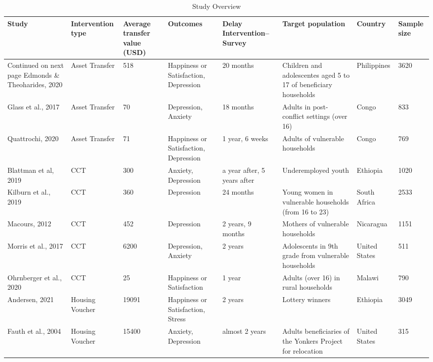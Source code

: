 \begingroup\scriptsize
\begin{longtable}{p{1.8cm}p{1.7cm}p{1.3 cm}p{1.8cm}p{1.7cm}p{2cm}p{1.2cm}p{1cm}}
\caption{Study Overview} \\ 
  \hline
{\textbf{Study}} & {\textbf{Intervention type}} & {\textbf{Average transfer value (USD)}} & {\textbf{Outcomes}} & {\textbf{Delay Intervention--Survey}} & {\textbf{Target 
 population}} & {\textbf{Country}} & {\textbf{Sample 
 size}} \\ 
  \hline 
\endhead 
\hline 
{\footnotesize Continued on next page} 
\endfoot 
\endlastfoot 
 \hline
Edmonds \& Theoharides, 2020 & Asset Transfer & 518 & Happiness or Satisfaction, Depression & 20 months & Children and adolescentes aged 5 to 17 of beneficiary households & Philippines & 3620 \\ 
   \hline
Glass et al., 2017 & Asset Transfer & 70 & Depression, Anxiety & 18 months & Adults in post-conflict settings (over 16) & Congo & 833 \\ 
   \hline
Quattrochi, 2020 & Asset Transfer & 71 & Happiness or Satisfaction, Depression & 1 year, 6 weeks & Adults of vulnerable households & Congo & 769 \\ 
   \hline
Blattman et al, 2019 & CCT & 300 & Anxiety, Depression & a year after, 5 years after & Underemployed youth & Ethiopia & 1020 \\ 
   \hline
Kilburn et al., 2019 & CCT & 360 & Depression & 24 months & Young women in vulnerable households (from 16 to 23) & South Africa & 2533 \\ 
   \hline
Macours, 2012 & CCT & 452 & Depression & 2 years, 9 months & Mothers of vulnerable households & Nicaragua & 1151 \\ 
   \hline
Morris et al., 2017 & CCT & 6200 & Depression, Anxiety & 2 years & Adolescents in 9th grade from vulnerable households & United States & 511 \\ 
   \hline
Ohrnberger et al., 2020 & CCT & 25 & Happiness or Satisfaction & 1 year & Adults (over 16) in rural households & Malawi & 790 \\ 
   \hline
Andersen, 2021 & Housing Voucher & 19091 & Happiness or Satisfaction, Stress & 2 years & Lottery winners & Ethiopia & 3049 \\ 
   \hline
Fauth et al., 2004 & Housing Voucher & 15400 & Anxiety, Depression & almost 2 years & Adults beneficiaries of the Yonkers Project for relocation & United States & 315 \\ 

\end{longtable}
